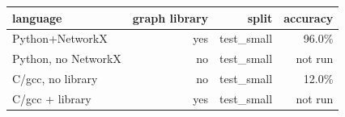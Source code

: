 \begin{tabular}{lrrr}
\toprule
language & graph library & split & accuracy \\
\midrule
Python+NetworkX & yes & test\_small & 96.0\% \\
Python, no NetworkX & no & test\_small & not run \\
C/gcc, no library & no & test\_small & 12.0\% \\
C/gcc + library & yes & test\_small & not run \\
\bottomrule
\end{tabular}
